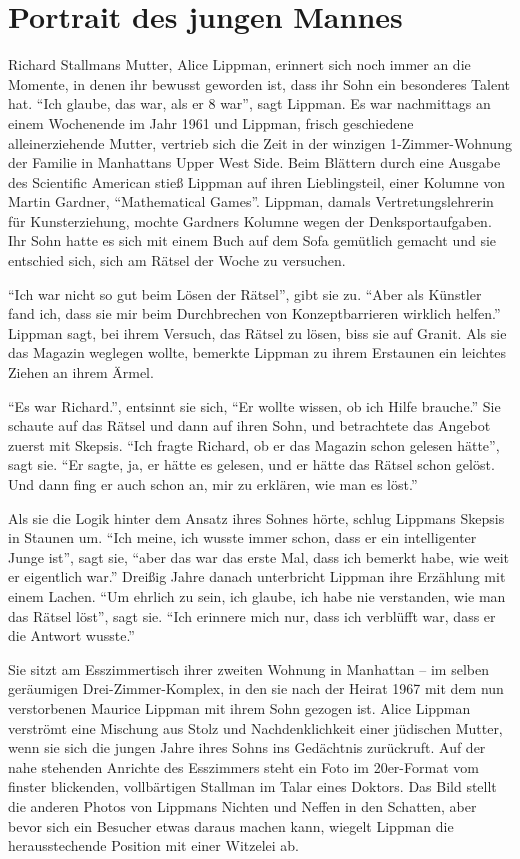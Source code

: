 \chapter{Portrait des jungen Mannes}

Richard Stallmans Mutter, Alice Lippman, erinnert sich noch immer an die Momente, in denen ihr bewusst geworden ist, dass ihr Sohn ein besonderes Talent hat. "`Ich glaube, das war, als er 8 war"', sagt Lippman. Es war nachmittags an einem Wochenende im Jahr 1961 und Lippman, frisch geschiedene alleinerziehende Mutter, vertrieb sich die Zeit in der winzigen 1-Zimmer-Wohnung der Familie in Manhattans Upper West Side. Beim Blättern durch eine Ausgabe des Scientific American stieß Lippman auf ihren Lieblingsteil, einer Kolumne von Martin Gardner, "`Mathematical Games"'. Lippman, damals Vertretungslehrerin für Kunsterziehung, mochte Gardners Kolumne wegen der Denksportaufgaben. Ihr Sohn hatte es sich mit einem Buch auf dem Sofa gemütlich gemacht und sie entschied sich, sich am Rätsel der Woche zu versuchen.

"`Ich war nicht so gut beim Lösen der Rätsel"', gibt sie zu. "`Aber als Künstler fand ich, dass sie mir beim Durchbrechen von Konzeptbarrieren wirklich helfen."' Lippman sagt, bei ihrem Versuch, das Rätsel zu lösen, biss sie auf Granit. Als sie das Magazin weglegen wollte, bemerkte Lippman zu ihrem Erstaunen ein leichtes Ziehen an ihrem Ärmel.

"`Es war Richard."', entsinnt sie sich, "`Er wollte wissen, ob ich Hilfe brauche."' Sie schaute auf das Rätsel und dann auf ihren Sohn, und betrachtete das Angebot zuerst mit Skepsis. "`Ich fragte Richard, ob er das Magazin schon gelesen hätte"', sagt sie. "`Er sagte, ja, er hätte es gelesen, und er hätte das Rätsel schon gelöst. Und dann fing er auch schon an, mir zu erklären, wie man es löst."'

Als sie die Logik hinter dem Ansatz ihres Sohnes hörte, schlug Lippmans Skepsis in Staunen um. "`Ich meine, ich wusste immer schon, dass er ein intelligenter Junge ist"', sagt sie, "`aber das war das erste Mal, dass ich bemerkt habe, wie weit er eigentlich war."'
Dreißig Jahre danach unterbricht Lippman ihre Erzählung mit einem Lachen. "`Um ehrlich zu sein, ich glaube, ich habe nie verstanden, wie man das Rätsel löst"', sagt sie. "`Ich erinnere mich nur, dass ich verblüfft war, dass er die Antwort wusste."'

Sie sitzt am Esszimmertisch ihrer zweiten Wohnung in Manhattan – im selben geräumigen Drei-Zimmer-Komplex, in den sie nach der Heirat 1967 mit dem nun verstorbenen Maurice Lippman mit ihrem Sohn gezogen ist. Alice Lippman verströmt eine Mischung aus Stolz und Nachdenklichkeit einer jüdischen Mutter, wenn sie sich die jungen Jahre ihres Sohns ins Gedächtnis zurückruft. Auf der nahe stehenden Anrichte des Esszimmers steht ein Foto im 20er-Format vom finster blickenden, vollbärtigen Stallman im Talar eines Doktors. Das Bild stellt die anderen Photos von Lippmans Nichten und Neffen in den Schatten, aber bevor sich ein Besucher etwas daraus machen kann, wiegelt Lippman die herausstechende Position mit einer Witzelei ab.

